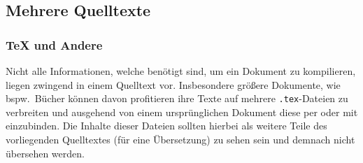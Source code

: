 \begin{comment}
    This is a \TeX{} example!
    \renewcommand{\TeX{}}{This is a TeX example!}
    \TeX{}
\end{comment}
\begin{comment}
    Muss zu:
        Das ist ein \TeX{} Beispiel!
        \renewcommand{\TeX{}}{Das ist ein TeX Beispiel!}
        \TeX{}
    werden und dabei:
        Das ist ein \TeX{} Beispiel!
        Das ist ein TeX Beispiel!
    produzieren und nicht:
        Das ist ein Das ist ein TeX Beispiel! Beispiel!
        Das ist ein TeX Beispiel!
\end{comment}

\subsection{Mehrere Quelltexte}
\subsubsection{\TeX{} und Andere}
Nicht alle Informationen, welche benötigt sind, um ein Dokument zu kompilieren, liegen zwingend in einem Quelltext vor. Insbesondere größere Dokumente, wie bspw.\ Bücher können davon profitieren ihre Texte auf mehrere \verb|.tex|-Dateien zu verbreiten und ausgehend von einem ursprünglichen Dokument diese per \verb|| oder \verb|| mit einzubinden. Die Inhalte dieser Dateien sollten hierbei als weitere Teile des vorliegenden Quelltextes (für eine Übersetzung) zu sehen sein und demnach nicht übersehen werden.%
\begin{comment}
    - Kurzfassung - 
    Datei 1:
        \documentclass{article}
        \title{sample}
        
        
        
        
    Datei sample.tex:
        Will i be translated?

    Erwarteter Output:
        Werde ich übersetzt?
        (nächste Seite)
        Werde ich übersetzt?
\end{comment}

